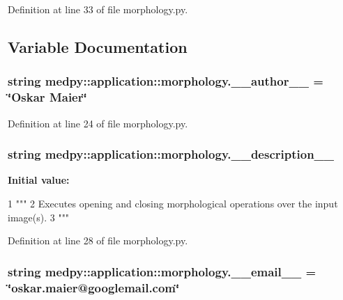 Definition at line 33 of file morphology.py.



\subsection{Variable Documentation}
\hypertarget{namespacemedpy_1_1application_1_1morphology_a944a307ced7f5defc3724c82427ea815}{
\subsubsection[{\_\-\_\-author\_\-\_\-}]{\setlength{\rightskip}{0pt plus 5cm}string {\bf medpy::application::morphology.\_\-\_\-author\_\-\_\-} = \char`\"{}Oskar Maier\char`\"{}}}
\label{namespacemedpy_1_1application_1_1morphology_a944a307ced7f5defc3724c82427ea815}


Definition at line 24 of file morphology.py.

\hypertarget{namespacemedpy_1_1application_1_1morphology_a9ff91e726f077b9edffd31ee7be7b841}{
\subsubsection[{\_\-\_\-description\_\-\_\-}]{\setlength{\rightskip}{0pt plus 5cm}string {\bf medpy::application::morphology.\_\-\_\-description\_\-\_\-}}}
\label{namespacemedpy_1_1application_1_1morphology_a9ff91e726f077b9edffd31ee7be7b841}
{\bfseries Initial value:}
\begin{DoxyCode}
1 """
2                   Executes opening and closing morphological operations over the 
      input image(s).
3                   """
\end{DoxyCode}


Definition at line 28 of file morphology.py.

\hypertarget{namespacemedpy_1_1application_1_1morphology_aafe8416d1b9746d52acfeb3cab3b02a9}{
\subsubsection[{\_\-\_\-email\_\-\_\-}]{\setlength{\rightskip}{0pt plus 5cm}string {\bf medpy::application::morphology.\_\-\_\-email\_\-\_\-} = \char`\"{}oskar.maier@googlemail.com\char`\"{}}}
\label{namespacemedpy_1_1application_1_1morphology_aafe8416d1b9746d52acfeb3cab3b02a9}


